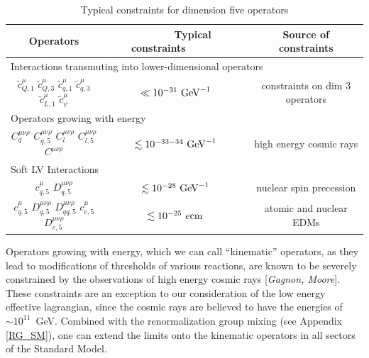 \documentclass[12pt]{revtex4}
\newcommand{\wt}{\widetilde}
\begin{document}
\begin{table}[tb]
\label{constr_table}
\caption{Typical constraints for dimension five operators}
\begin{tabular}{|ccc|}
\hline
	\multicolumn{1}{|c|}{Operators} & 
	\multicolumn{1}{|c|}{~~~~~~Typical constraints~~~~~~} & 
	\multicolumn{1}{|c|}{Source of constraints} \\
\hline
	\multicolumn{3}{|l|}{\quad Interactions transmuting into
				lower-dimensional operators } \\
\hline
	$ \wt{c}_{Q,1}^\mu  $
	$ \wt{c}_{Q,3}^\mu  $
	$ \wt{c}_{q,1}^\mu  $
	$ \wt{c}_{q,3}^\mu  $
	$ \wt{c}_{L,1}^\mu  $
	$ \wt{c}_{\psi}^\mu $  &
	$ \ll 10^{-31}~{\rm GeV}^{-1} $ &
	constraints on dim 3 operators
	\\
\hline
	\multicolumn{3}{|l|}{\quad Operators growing with energy} \\
\hline
	$ C_{q}^{\mu\nu\rho} $ $ C_{q,5}^{\mu\nu\rho} $
	$ C_l^{\mu\nu\rho} $  $ C_{l,5}^{\mu\nu\rho} $
	$ C^{\mu\nu\rho} $ &
	$ \lesssim 10^{-33-34}~{\rm GeV}^{-1} $
	&
	high energy cosmic rays
	\\
\hline
	\multicolumn{3}{|l|}{\quad Soft LV Interactions} \\
\hline
	$ c^\mu_{q,5} $ $ D^{\mu\nu\rho}_{q,5} $ &
	$ \lesssim 10^{-28}~{\rm GeV}^{-1} $     &
	nuclear spin precession \\
\hline
	$ c^\mu_{q,5} $ $ D^{\mu\nu\rho}_{q,5} $ 
	$ D^{\mu\nu\rho}_{qq,5} $ 
	$ c^\mu_{e,5} $ $ D^{\mu\nu\rho}_{e,5} $ &
	$ \lesssim 10^{-25}~e{\rm cm} $          &
	atomic and nuclear EDMs \\
\hline
\end{tabular}
\end{table}
	
	Operators growing with energy, which we can call ``kinematic'' operators,
	as they lead to modifications of thresholds of various reactions, are 
	known to be severely constrained by the
	observations of high energy cosmic rays [{\it Gagnon, Moore}].
	These constraints are an exception to our consideration of the low energy 
	effective lagrangian, since the cosmic rays are believed to have the
	energies of $ \sim 10^{11} $~GeV.
	Combined with the renormalization group mixing
	(see Appendix \ref{RG_SM}), one can extend
	the limits onto the kinematic operators in all sectors of the Standard Model.
	
\end{document}
